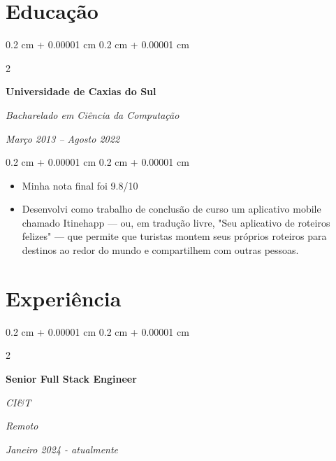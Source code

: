 \documentclass[10pt, letterpaper]{article}
\newenvironment{highlights}{
    \begin{itemize}[
        topsep=0.10 cm,
        parsep=0.10 cm,
        partopsep=0pt,
        itemsep=0pt,
        leftmargin=0.4 cm + 10pt
    ]
}{
    \end{itemize}
} %
\newenvironment{onecolentry}{
    \begin{adjustwidth}{
        0.2 cm + 0.00001 cm
    }{
        0.2 cm + 0.00001 cm
    }
}{
    \end{adjustwidth}
} %
\newenvironment{twocolentry}[2][]{
    \onecolentry
    \def\secondColumn{#2}
    \setcolumnwidth{\fill, 4.5 cm}
    \begin{paracol}{2}
}{
    \switchcolumn \raggedleft \secondColumn
    \end{paracol}
    \endonecolentry
} %
\begin{document}
    \section{Educação}


        \begin{twocolentry}{
            
            
        \textit{Março 2013 – Agosto 2022}}
            \textbf{Universidade de Caxias do Sul}

            \textit{Bacharelado em Ciência da Computação}
        \end{twocolentry}

        \vspace{0.10 cm}
        \begin{onecolentry}
            \begin{highlights}
                \item Minha nota final foi 9.8/10
                \item Desenvolvi como trabalho de conclusão de curso um aplicativo mobile chamado Itinehapp — ou, em tradução livre, "Seu aplicativo de roteiros felizes" — que permite que turistas montem seus próprios roteiros para destinos ao redor do mundo e compartilhem com outras pessoas.
            \end{highlights}
        \end{onecolentry}



    
    \section{Experiência}

        \begin{twocolentry}{
        \textit{Remoto}    
            
        \textit{Janeiro 2024 - atualmente}}
            \textbf{Senior Full Stack Engineer}
            
            \textit{CI\&T}
        \end{twocolentry}
\end{document}

